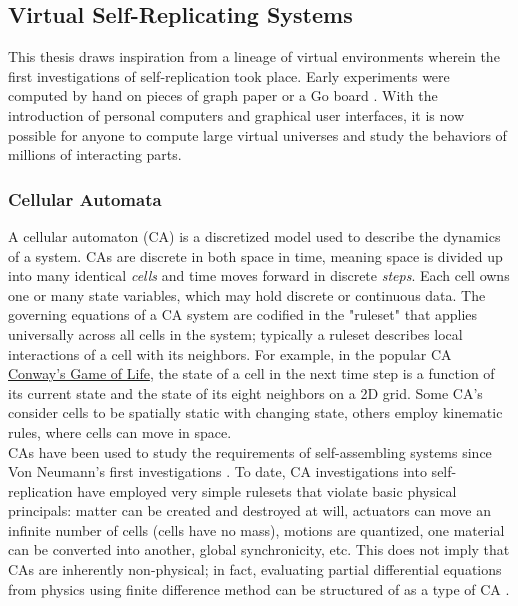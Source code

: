 {%
\subsection{Virtual Self-Replicating Systems}

This thesis draws inspiration from a lineage of virtual environments wherein the first investigations of self-replication took place.  Early experiments were computed by hand on pieces of graph paper or a Go board \cite{Gardner1970}.  With the introduction of personal computers and graphical user interfaces, it is now possible for anyone to compute large virtual universes and study the behaviors of millions of interacting parts.

\subsubsection{Cellular Automata}

A cellular automaton (CA) is a discretized model used to describe the dynamics of a system.  CAs are discrete in both space in time, meaning space is divided up into many identical \textit{cells} and time moves forward in discrete \textit{steps}.  Each cell owns one or many state variables, which may hold discrete or continuous data.  The governing equations of a CA system are codified in the "ruleset" that applies universally across all cells in the system; typically a ruleset describes local interactions of a cell with its neighbors.  For example, in the popular CA \href{https://en.wikipedia.org/wiki/Conway's_Game_of_Life}{Conway's Game of Life}, the state of a cell in the next time step is a function of its current state and the state of its eight neighbors on a 2D grid.  Some CA's consider cells to be spatially static with changing state, others employ kinematic rules, where cells can move in space.\\

CAs have been used to study the requirements of self-assembling systems since Von Neumann's first investigations \cite{Neumann1966}.  To date, CA investigations into self-replication have employed very simple rulesets that violate basic physical principals: matter can be created and destroyed at will, actuators can move an infinite number of cells (cells have no mass), motions are quantized, one material can be converted into another, global synchronicity, etc.  This does not imply that CAs are inherently non-physical; in fact, evaluating partial differential equations from physics using finite difference method can be structured of as a type of CA \cite{Yang2010}.

}

